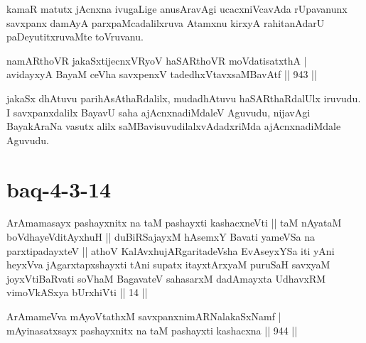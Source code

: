 \begin{artha}
kamaR matutx jAcnxna ivugaLige anusAravAgi ucacxniVcavAda rUpavanunx savxpanx damAyA parxpaMcadalilxruva Atamxnu kirxyA rahitanAdarU paDeyutitxruvaMte toVruvanu.
\end{artha}


\begin{shl}
namARthoVR \footnotemark[1]jakaSxtijecnxVRyoV haSARthoVR moVdatisatxthA | \\
avidayxyA BayaM ceVha savxpenxV tadedhxVtavxsaMBavAtf \hfill||  943 ||  
\end{shl}

\begin{artha}
jakaSx dhAtuvu parihAsAthaRdalilx, mudadhAtuvu haSARthaRdalUlx iruvudu. I savxpanxdalilx BayavU saha ajAcnxnadiMdaleV Aguvudu, nijavAgi BayakAraNa vasutx alilx saMBavisuvudilalxvAdadxriMda ajAcnxnadiMdale Aguvudu.
\end{artha}

\section*{baq-4-3-14}

\begin{shl}
ArAmamasayx pashayxnitx na taM pashayxti kashacxneVti || taM nAyataM boVdhayeVditAyxhuH || duBiRSajayxM hAsemxY Bavati yameVSa na parxtipadayxteV || athoV KalAvxhujARgaritadeVsha EvAseyxYSa iti yAni heyxVva jAgarxtapxshayxti tAni supatx itayxtArxyaM puruSaH savxyaM joyxVtiBaRvati soV\s haM BagavateV sahasarxM dadAmayxta UdhavxRM vimoVkASxya bUrxhiVti || 14 ||
\end{shl}


\begin{shl}
ArAmameVva mAyoVtathxM savxpanxnimARNalakaSxNamf | \\
mAyinasatxsayx pashayxnitx na taM pashayxti kashacxna \hfill||  944 ||  
\end{shl}

